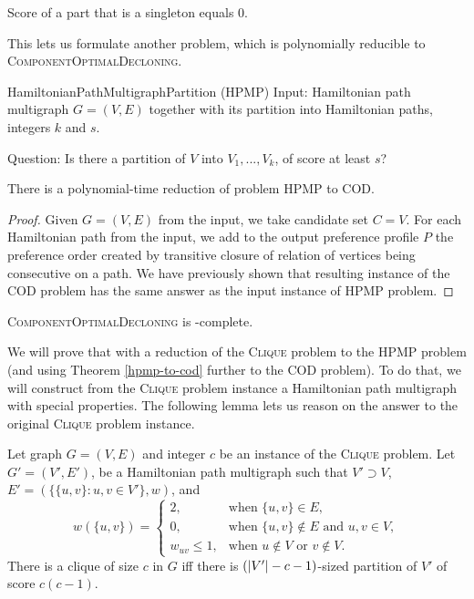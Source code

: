 \begin{rmrk}
Score of a part that is a singleton equals $0$.
\end{rmrk}

This lets us formulate another problem, which is polynomially reducible
to \textsc{ComponentOptimalDecloning}.

\begin{problem}{HamiltonianPathMultigraphPartition (HPMP)}
	Input: Hamiltonian path multigraph $G=(V,E)$
		together with its partition into Hamiltonian paths, integers $k$ and $s$.

	Question: Is there a partition of $V$ into $V_1, ..., V_k$,
        of score at least $s$?
\end{problem}

\begin{thm} \label{hpmp-to-cod}
There is a polynomial-time reduction of problem \textsc{HPMP} to \textsc{COD}.
\end{thm}

\begin{proof}
Given $G=(V,E)$ from the input, we take candidate set $C=V$.
For each Hamiltonian path from the input, we add to the output preference profile $P$
the preference order created by transitive closure of relation of vertices being consecutive on a path.
We have previously shown that resulting instance of the \textsc{COD} problem 
has the same answer as the input instance of \textsc{HPMP} problem.
\end{proof}


\begin{thm} \label{ultimate-theorem}
\textsc{ComponentOptimalDecloning} is \np-complete.
\end{thm}

We will prove that with a reduction of the \textsc{Clique} problem to the \textsc{HPMP} problem
(and using Theorem \ref{hpmp-to-cod} further to the \textsc{COD} problem).
To do that, we will construct from the \textsc{Clique} problem instance
a Hamiltonian path multigraph with special properties.
The following lemma lets us reason on the answer to the original \textsc{Clique} problem instance.

\begin{lmm} \label{hpmp-red}
Let graph $G = (V, E)$ and integer $c$ be an instance of the \textsc{Clique} problem.
Let $G'=(V',E')$,  be a Hamiltonian path multigraph
such that $V' \supset V$, $E'=(\{\{u,v\}: u,v \in V'\}, w)$, and
$$ w(\{u,v\}) =
\begin{cases}
2, 				&\text{when } \{u,v\} \in E ,\\
0, 				&\text{when } \{u,v\} \not\in E \text{ and } u,v \in V ,\\
w_{u v}\leq 1,	&\text{when } u \not\in V \text{ or } v \not\in V.
\end{cases}
$$
There is a clique of size $c$ in $G$ iff
there is $\left(\left\vert V' \right\vert-c-1\right)$-sized partition of $V'$ of score $c(c-1)$.
\end{lmm}

